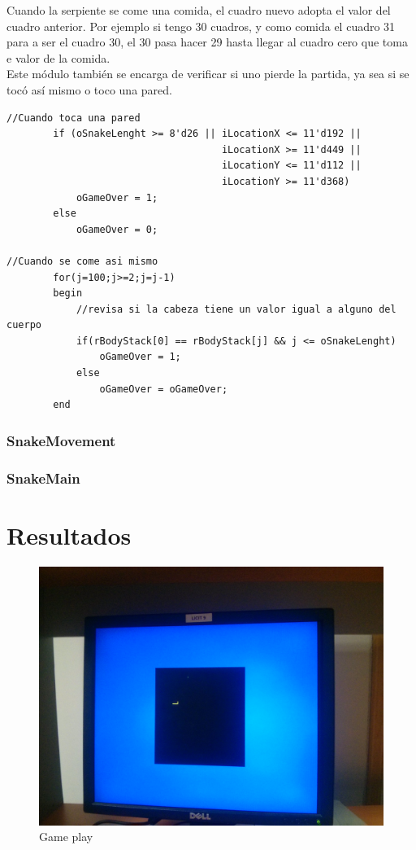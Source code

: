 \documentclass[10pt]{article}
\begin{document}
Cuando la serpiente se come una comida, el cuadro nuevo adopta el valor del cuadro anterior. Por ejemplo si tengo 30 cuadros, y como comida el cuadro 31 para a ser el cuadro 30, el 30 pasa hacer 29 hasta llegar al cuadro cero que toma e valor de la comida.\\

Este módulo también se encarga de verificar si uno pierde la partida, ya sea si se tocó así mismo o toco una pared.

\begin{lstlisting}
//Cuando toca una pared
		if (oSnakeLenght >= 8'd26 || iLocationX <= 11'd192 ||  
		                             iLocationX >= 11'd449 || 
		                             iLocationY <= 11'd112 || 
		                             iLocationY >= 11'd368)
			oGameOver = 1;
		else
			oGameOver = 0;

//Cuando se come asi mismo			
		for(j=100;j>=2;j=j-1) 
		begin
			//revisa si la cabeza tiene un valor igual a alguno del cuerpo 
			if(rBodyStack[0] == rBodyStack[j] && j <= oSnakeLenght)
				oGameOver = 1;
			else
				oGameOver = oGameOver;
		end	
\end{lstlisting}
		 
\subsubsection{SnakeMovement}


\subsubsection{SnakeMain}


\section{Resultados}

\begin{figure}[hbtp]
\centering
\includegraphics[width=1\textwidth]{game-play}
\caption{Game play}
\label{vga-play}
\end{figure}
\end{document}
